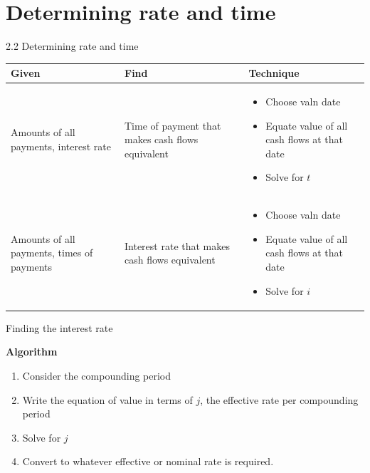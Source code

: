 \documentclass{beamer}
\begin{document}
\section{Determining rate and time}

\begin{frame}{2.2 Determining rate and time}

\small
\renewcommand{\arraystretch}{1.2}
\begin{tabular}{@{}>{\raggedright\arraybackslash}p{}>{\raggedright\arraybackslash}p{}p{}@{}}
\toprule
\textbf{Given} & \textbf{Find} & \textbf{Technique} \\
\midrule
Amounts of all payments, interest rate
& Time of payment that makes cash flows equivalent
& \vspace{-2ex}\begin{itemize}
  \item Choose valn date
  \item Equate value of all cash flows at that date
  \item Solve for $t$
  \end{itemize} \\
\midrule
Amounts of all payments, times of payments
& Interest rate that makes cash flows equivalent
& \vspace{-2ex}\begin{itemize}
  \item Choose valn date
  \item Equate value of all cash flows at that date
  \item Solve for $i$
  \end{itemize} \\
\bottomrule
\end{tabular}

\end{frame}

\begin{frame}{Finding the interest rate}

\textbf{Algorithm}
\begin{enumerate}
\item Consider the compounding period
\item Write the equation of value in terms of $j$, the effective rate per compounding period
\item Solve for $j$
\item Convert to whatever effective or nominal rate is required.
\end{enumerate}

\end{frame}
\end{document}
